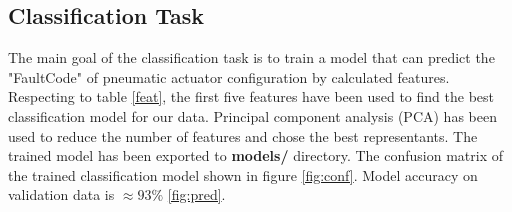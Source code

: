 \documentclass[class=article, crop=false]{standalone}
\begin{document}
\subsection{Classification Task}

The main goal of the classification task is to train a model that can
predict the "FaultCode" of pneumatic actuator configuration by
calculated features.
Respecting to table \ref{feat}, the first five features have been used to
find the best classification model for our data.
Principal component analysis (PCA) has been used to reduce the number of
features and chose the best representants.
The trained model has been exported to
\textbf{models/} directory.
The confusion matrix of the trained classification model shown in figure
\ref{fig:conf}. Model accuracy on validation data is $\approx 93 \%$
\ref{fig:pred}.
\end{document}
